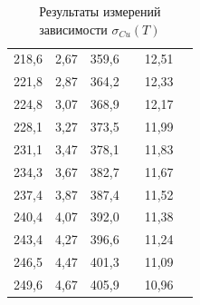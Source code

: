 \documentclass[a4paper,12pt]{report}
\begin{document}
\begin{table}[h!]
\begin{tabular}{|c|c|c|c|c|c|}
218,6     & 2,67 & 359,6 &                       & 12,51                            &                                        \\ \cline{1-3} \cline{5-5}
221,8     & 2,87 & 364,2 &                       & 12,33                            &                                        \\ \cline{1-3} \cline{5-5}
224,8     & 3,07 & 368,9 &                       & 12,17                            &                                        \\ \cline{1-3} \cline{5-5}
228,1     & 3,27 & 373,5 &                       & 11,99                            &                                        \\ \cline{1-3} \cline{5-5}
231,1     & 3,47 & 378,1 &                       & 11,83                            &                                        \\ \cline{1-3} \cline{5-5}
234,3     & 3,67 & 382,7 &                       & 11,67                            &                                        \\ \cline{1-3} \cline{5-5}
237,4     & 3,87 & 387,4 &                       & 11,52                            &                                        \\ \cline{1-3} \cline{5-5}
240,4     & 4,07 & 392,0 &                       & 11,38                            &                                        \\ \cline{1-3} \cline{5-5}
243,4     & 4,27 & 396,6 &                       & 11,24                            &                                        \\ \cline{1-3} \cline{5-5}
246,5     & 4,47 & 401,3 &                       & 11,09                            &                                        \\ \cline{1-3} \cline{5-5}
249,6     & 4,67 & 405,9 &                       & 10,96                            &                                        \\ \hline
\end{tabular}
\caption{Результаты измерений зависимости $\sigma_{Cu}(T)$}
\label{table_cu}
\end{table}
\end{document}
